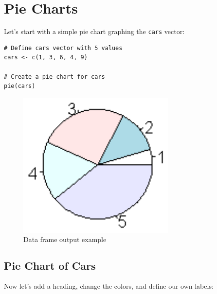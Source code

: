 \documentclass[10pt]{book}
\begin{document}
\section*{Pie Charts}

Let's start with a simple pie chart graphing the \texttt{cars} vector:

\begin{lstlisting}
# Define cars vector with 5 values
cars <- c(1, 3, 6, 4, 9)

# Create a pie chart for cars
pie(cars)
\end{lstlisting}
\begin{figure}[H]
    \begin{flushleft}
        \includegraphics[width=0.7\textwidth]{pie_script1.png}
        \caption{Data frame output example}
        \label{fig:dataframe}
    \end{flushleft}
\end{figure}

\subsection*{Pie Chart of Cars}
Now let's add a heading, change the colors, and define our own labels:
\end{document}
